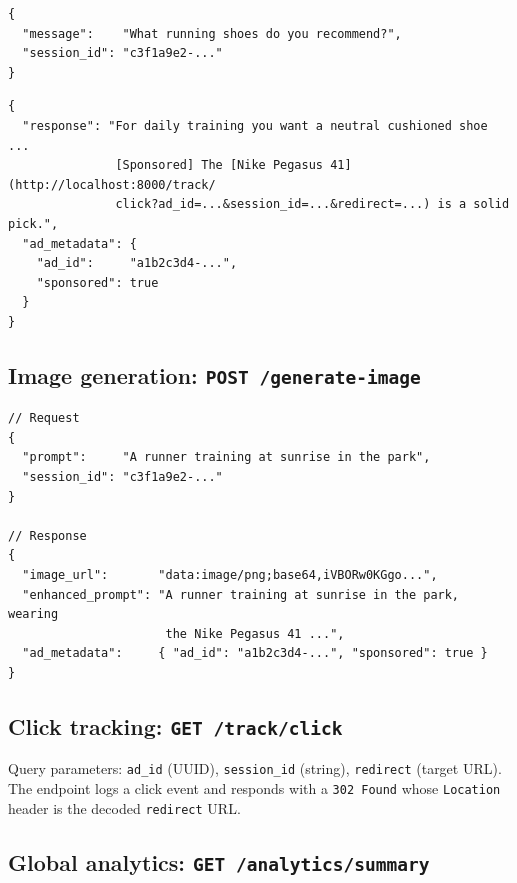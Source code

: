 \begin{appendices}
\begin{lstlisting}[style=jsonstyle, caption={\texttt{POST /chat} request body.}]
{
  "message":    "What running shoes do you recommend?",
  "session_id": "c3f1a9e2-..."
}
\end{lstlisting}

\begin{lstlisting}[style=jsonstyle, caption={\texttt{POST /chat} response body. The
    \texttt{ad\_metadata} object is \texttt{null} when no ad was injected.}]
{
  "response": "For daily training you want a neutral cushioned shoe ...
               [Sponsored] The [Nike Pegasus 41](http://localhost:8000/track/
               click?ad_id=...&session_id=...&redirect=...) is a solid pick.",
  "ad_metadata": {
    "ad_id":     "a1b2c3d4-...",
    "sponsored": true
  }
}
\end{lstlisting}

\subsection*{Image generation: \texttt{POST /generate-image}}

\begin{lstlisting}[style=jsonstyle, caption={Image generation contract.}]
// Request
{
  "prompt":     "A runner training at sunrise in the park",
  "session_id": "c3f1a9e2-..."
}

// Response
{
  "image_url":       "data:image/png;base64,iVBORw0KGgo...",
  "enhanced_prompt": "A runner training at sunrise in the park, wearing
                      the Nike Pegasus 41 ...",
  "ad_metadata":     { "ad_id": "a1b2c3d4-...", "sponsored": true }
}
\end{lstlisting}

\subsection*{Click tracking: \texttt{GET /track/click}}

Query parameters: \texttt{ad\_id} (UUID), \texttt{session\_id} (string),
\texttt{redirect} (target URL). The endpoint logs a click event and
responds with a \texttt{302 Found} whose \texttt{Location} header is
the decoded \texttt{redirect} URL.

\subsection*{Global analytics: \texttt{GET /analytics/summary}}


\end{appendices}
